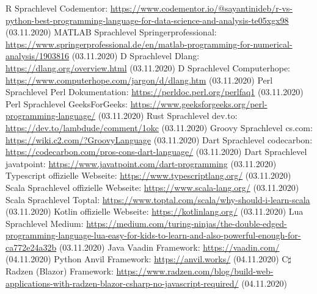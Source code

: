 \documentclass[ngerman]{article}
\begin{document}
\begin{thebibliography}{9}
        R Sprachlevel Codementor: \url{https://www.codementor.io/@sayantinideb/r-vs-python-best-programming-language-for-data-science-and-analysis-te05xgx98} (03.11.2020)
        MATLAB Sprachlevel Springerprofessional: \url{https://www.springerprofessional.de/en/matlab-programming-for-numerical-analysis/1903816} (03.11.2020)
        D Sprachlevel Dlang: \url{https://dlang.org/overview.html} (03.11.2020)
        D Sprachlevel Computerhope: \url{https://www.computerhope.com/jargon/d/dlang.htm} (03.11.2020)
        Perl Sprachlevel Perl Dokumentation: \url{https://perldoc.perl.org/perlfaq1} (03.11.2020)
        Perl Sprachlevel GeeksForGeeks: \url{https://www.geeksforgeeks.org/perl-programming-language/} (03.11.2020)
        Rust Sprachlevel dev.to: \url{https://dev.to/lambdude/comment/1okc} (03.11.2020)
        Groovy Sprachlevel cs.com: \url{https://wiki.c2.com/?GroovyLanguage} (03.11.2020)
        Dart Sprachlevel codecarbon: \url{https://codecarbon.com/pros-cons-dart-language/} (03.11.2020)
        Dart Sprachlevel javatpoint: \url{https://www.javatpoint.com/dart-programming} (03.11.2020)
        Typescript offizielle Webseite: \url{https://www.typescriptlang.org/} (03.11.2020)
        Scala Sprachlevel offizielle Webseite: \url{https://www.scala-lang.org/} (03.11.2020)
        Scala Sprachlevel Toptal: \url{https://www.toptal.com/scala/why-should-i-learn-scala} (03.11.2020)
        Kotlin offizielle Webseite: \url{https://kotlinlang.org/} (03.11.2020)
        Lua Sprachlevel Medium: \url{https://medium.com/turing-ninjas/the-double-edged-programming-language-lua-easy-for-kids-to-learn-and-also-powerful-enough-for-ca772e24a32b} (03.11.2020)
        Java Vaadin Framework: \url{https://vaadin.com/} (04.11.2020)
        Python Anvil Framework: \url{https://anvil.works/} (04.11.2020)
        C$\sharp$ Radzen (Blazor) Framework: \url{https://www.radzen.com/blog/build-web-applications-with-radzen-blazor-csharp-no-javascript-required/} (04.11.2020)

\end{thebibliography}
\end{document}
